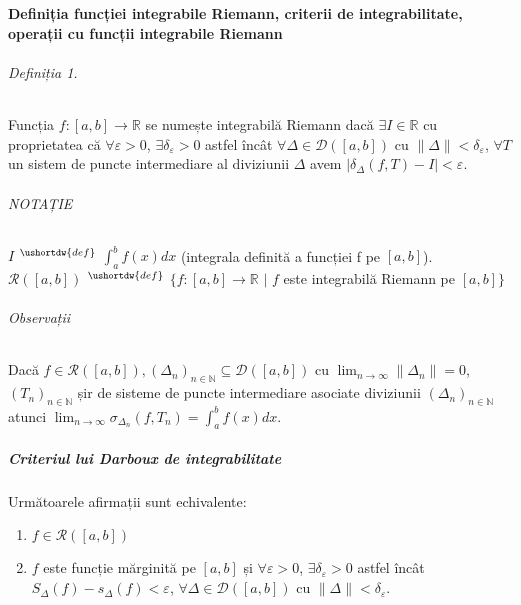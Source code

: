 \part{}
\subsection{Definiția funcției integrabile Riemann, criterii de integrabilitate, operații cu funcții integrabile Riemann}

\paragraph{Definiția 1.}
Funcția $f:[a,b] \rightarrow \mathbb{R}$ se numește integrabilă Riemann dacă $\exists I \in \mathbb{R}$ cu proprietatea că $\forall \varepsilon > 0$, $\exists \delta_{\varepsilon} > 0$
astfel încât $\forall \Delta \in \mathcal{D}([a,b])$ cu $\lVert \Delta \rVert < \delta_{\varepsilon}$, $\forall T$ un sistem de puncte intermediare al diviziunii $\Delta$ avem
$\left| \delta_{\Delta}(f, T) - I \right| < \varepsilon$.

\paragraph{NOTAȚIE}
$I$ $^{\ushortdw{def}}$ $\displaystyle\int_{a}^{b}f(x) dx$ (integrala definită a funcției f pe $[a,b]$). \\
$\mathcal{R}([a,b])$ $^{\ushortdw{def}}$ $\{ f:[a,b] \rightarrow \mathbb{R}$ $\vert$ $f$ este integrabilă Riemann pe $[a,b] \}$

\paragraph{Observații}
Dacă $f \in \mathcal{R}([a,b]), (\Delta_{n})_{n \in \mathbb{N}} \subseteq \mathcal{D}([a,b])$ cu $\displaystyle\lim_{n \rightarrow \infty} \lVert \Delta_{n} \rVert = 0$,
$(T_{n})_{n \in \mathbb{N}}$ șir de sisteme de puncte intermediare asociate diviziunii $(\Delta_{n})_{n \in \mathbb{N}}$ atunci
$\displaystyle\lim_{n \rightarrow \infty} \sigma_{\Delta_{n}}(f, T_{n}) = \displaystyle\int_{a}^{b} f(x) dx$. 

\subsubsection{Criteriul lui Darboux de integrabilitate}
Următoarele afirmații sunt echivalente:
\begin{enumerate}[label=\emph{\alph*})]
    \item $f \in \mathcal{R}([a,b])$
    \item $f$ este funcție mărginită pe $[a,b]$ și $\forall \varepsilon > 0$, $\exists \delta_{\varepsilon} > 0$ astfel încât
    $S_{\Delta}(f) - s_{\Delta}(f) < \varepsilon$, $\forall \Delta \in \mathcal{D}([a,b])$ cu $\lVert \Delta \rVert < \delta_{\varepsilon}$.
\end{enumerate}

